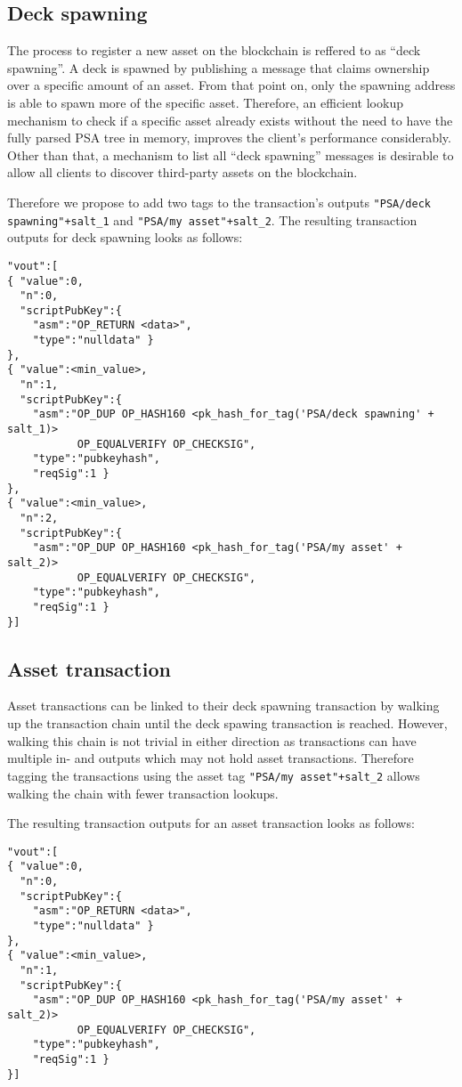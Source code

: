 \documentclass[a4paper,10pt]{article}
\begin{document}
\subsection{Deck spawning}
The process to register a new asset on the blockchain is reffered to as ``deck spawning''. A deck is spawned by publishing a message that claims ownership over a specific amount of an asset. From that point on, only the spawning address is able to spawn more of the specific asset. Therefore, an efficient lookup mechanism to check if a specific asset already exists without the need to have the fully parsed PSA tree in memory, improves the client's performance considerably. Other than that, a mechanism to list all ``deck spawning'' messages is desirable to allow all clients to discover third-party assets on the blockchain.

Therefore we propose to add two tags to the transaction's outputs \verb|"PSA/deck spawning"+salt_1| and \verb|"PSA/my asset"+salt_2|.
The resulting transaction outputs for deck spawning looks as follows:
\begin{verbatim}
"vout":[
{ "value":0,
  "n":0,
  "scriptPubKey":{
    "asm":"OP_RETURN <data>",
    "type":"nulldata" }
},
{ "value":<min_value>,
  "n":1,
  "scriptPubKey":{
    "asm":"OP_DUP OP_HASH160 <pk_hash_for_tag('PSA/deck spawning' + salt_1)>
           OP_EQUALVERIFY OP_CHECKSIG",
    "type":"pubkeyhash",
    "reqSig":1 }
},
{ "value":<min_value>,
  "n":2,
  "scriptPubKey":{
    "asm":"OP_DUP OP_HASH160 <pk_hash_for_tag('PSA/my asset' + salt_2)>
           OP_EQUALVERIFY OP_CHECKSIG",
    "type":"pubkeyhash",
    "reqSig":1 }
}]
\end{verbatim}

\subsection{Asset transaction}
Asset transactions can be linked to their deck spawning transaction by walking up the transaction chain until the deck spawing transaction is reached.
However, walking this chain is not trivial in either direction as transactions can have multiple in- and outputs which may not hold asset transactions.
Therefore tagging the transactions using the asset tag \verb|"PSA/my asset"+salt_2| allows walking the chain with fewer transaction lookups.

The resulting transaction outputs for an asset transaction looks as follows:
\begin{verbatim}
"vout":[
{ "value":0,
  "n":0,
  "scriptPubKey":{
    "asm":"OP_RETURN <data>",
    "type":"nulldata" }
},
{ "value":<min_value>,
  "n":1,
  "scriptPubKey":{
    "asm":"OP_DUP OP_HASH160 <pk_hash_for_tag('PSA/my asset' + salt_2)>
           OP_EQUALVERIFY OP_CHECKSIG",
    "type":"pubkeyhash",
    "reqSig":1 }
}]
\end{verbatim}
\end{document}
